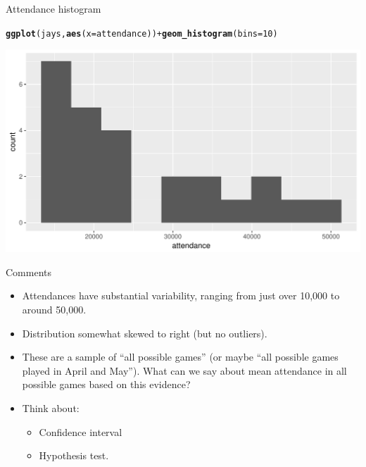 \documentclass[unknownkeysallowed]{beamer}\usepackage[]{graphicx}\usepackage[]{color}
\makeatletter
\def\maxwidth{ %
  \ifdim\Gin@nat@width>\linewidth
    \linewidth
  \else
    \Gin@nat@width
  \fi
}
\newcommand{\hlnum}[1]{\textcolor[rgb]{0.686,0.059,0.569}{#1}}%
\newcommand{\hlopt}[1]{\textcolor[rgb]{0,0,0}{#1}}%
\newcommand{\hlstd}[1]{\textcolor[rgb]{0.345,0.345,0.345}{#1}}%
\newcommand{\hlkwc}[1]{\textcolor[rgb]{0.333,0.667,0.333}{#1}}%
\newcommand{\hlkwd}[1]{\textcolor[rgb]{0.737,0.353,0.396}{\textbf{#1}}}%
\newenvironment{kframe}{%
 \def\at@end@of@kframe{}%
 \ifinner\ifhmode%
  \def\at@end@of@kframe{\end{minipage}}%
  \begin{minipage}{\columnwidth}%
 \fi\fi%
 \def\FrameCommand##1{\hskip\@totalleftmargin \hskip-\fboxsep
 \colorbox{shadecolor}{##1}\hskip-\fboxsep
     \hskip-\linewidth \hskip-\@totalleftmargin \hskip\columnwidth}%
 \MakeFramed {\advance\hsize-\width
   \@totalleftmargin\z@ \linewidth\hsize
   \@setminipage}}%
 {\par\unskip\endMakeFramed%
 \at@end@of@kframe}
\newenvironment{knitrout}{}{} %
\makeatother
\begin{document}
\begin{frame}[fragile]{Attendance histogram}
\begin{knitrout}
\color{fgcolor}\begin{kframe}
\begin{alltt}
\hlkwd{ggplot}\hlstd{(jays,}\hlkwd{aes}\hlstd{(}\hlkwc{x}\hlstd{=attendance))}\hlopt{+}\hlkwd{geom_histogram}\hlstd{(}\hlkwc{bins}\hlstd{=}\hlnum{10}\hlstd{)}
\end{alltt}
\end{kframe}
\includegraphics[width=\maxwidth]{figure/unnamed-chunk-46-1} 

\end{knitrout}

\end{frame}

\begin{frame}[fragile]{Comments}
  
  \begin{itemize}
  \item Attendances have substantial variability, ranging from just
    over 10,000 to around 50,000.
  \item Distribution somewhat skewed to right (but no outliers).
  \item These are a sample of ``all possible games'' (or maybe ``all
    possible games played in April and May''). What can we say about
    mean attendance in all possible games based on this evidence?
  \item Think about:
    \begin{itemize}
    \item Confidence interval
    \item Hypothesis test.
    \end{itemize}
  \end{itemize}
  
\end{frame}
\end{document}
